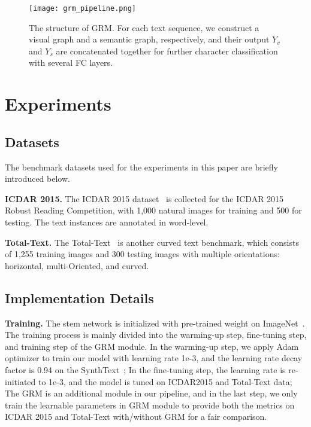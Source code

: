 \documentclass[letterpaper]{article} \usepackage{aaai21}  \usepackage{times}  \usepackage{helvet} \usepackage{courier}  \usepackage[hyphens]{url}  \usepackage{graphicx} \urlstyle{rm} \def\UrlFont{\rm}  \usepackage{natbib}  \usepackage{caption} \usepackage{bm}
\begin{document}
\begin{figure}
    \centering
    \texttt{[image: grm\_pipeline.png]}
    \caption{The structure of GRM. For each text sequence, we construct a visual graph and a semantic graph, respectively, and their output ${Y_v}$ and ${Y_s}$ are concatenated together for further character classification with several FC layers.}
    \label{fig:grm_pipeline}
\end{figure}



\section{Experiments}

\subsection{Datasets}
The benchmark datasets used for the experiments in this paper are briefly introduced below.

\textbf{ICDAR 2015.} The ICDAR 2015 dataset~\cite{karatzas2015icdar} is collected for the ICDAR 2015 Robust Reading Competition, with 1,000 natural images for training and 500 for testing. The text instances are annotated in word-level.

\textbf{Total-Text.} The Total-Text~\cite{ch2017total} is another curved text benchmark, which consists of 1,255 training images and 300 testing images with multiple orientations: horizontal, multi-Oriented, and curved. 


\subsection{Implementation Details}
\textbf{Training.} The stem network is initialized with pre-trained weight on ImageNet~\cite{deng2009imagenet}. The training process is mainly divided into the warming-up step, fine-tuning step, and training step of the GRM module. In the warming-up step, we apply Adam optimizer to train our model with learning rate 1e-3, and the learning rate decay factor is 0.94 on the SynthText~\cite{gupta2016synthetic}; In the fine-tuning step, the learning rate is re-initiated to 1e-3, and the model is tuned on ICDAR2015 and Total-Text data; The GRM is an additional module in our pipeline, and in the last step, we only train the learnable parameters in GRM module to provide both the metrics on ICDAR 2015 and Total-Text with/without GRM for a fair comparison.
\end{document}
